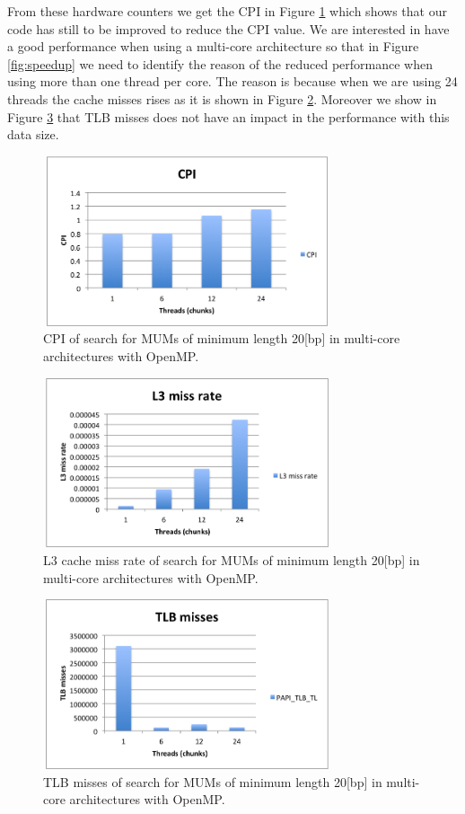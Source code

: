 \documentclass[3p,times]{elsarticle}
\begin{document}
 From these hardware counters we get the CPI in Figure \ref{fig:CPI} which shows that our code has still to be improved to reduce the CPI value. We are interested in have a good performance when using a multi-core architecture so that in Figure \ref{fig:speedup} we need to identify the reason of the reduced performance when using more than one thread per core. The reason is because when we are using 24 threads the cache misses rises as it is shown in Figure \ref{fig:misses}. Moreover we show in Figure \ref{fig:tlb} that TLB misses does not have an impact in the performance with this data size.
 \begin{figure}[htb]
  \centering
  \includegraphics[width=8.5cm,height=5cm]{cpi.png}
  \caption{CPI of search for MUMs of minimum length 20[bp] in multi-core architectures with OpenMP.}
  \label{fig:CPI}
 \end{figure}
 \begin{figure}[htb]
  \centering
  \includegraphics[width=8.5cm,height=5cm]{l3missrate.png}
  \caption{L3 cache miss rate of search for MUMs of minimum length 20[bp] in multi-core architectures with OpenMP.}
  \label{fig:misses}
 \end{figure}
 \begin{figure}[htb]
  \centering
  \includegraphics[width=8.5cm,height=5cm]{tlbmisses.png}
  \caption{TLB misses of search for MUMs of minimum length 20[bp] in multi-core architectures with OpenMP.}
  \label{fig:tlb}
 \end{figure}
\end{document}
